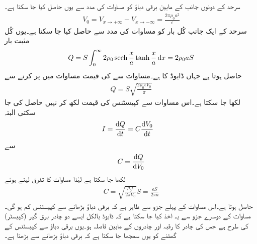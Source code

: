 سرحد کے دونوں جانب کے مابین برقی دباؤ  کو مساوات  کی مدد سے یوں حاصل کیا جا سکتا ہے۔
\begin{align}\label{مساوات_لاپلاس_ڈایوڈ_اندرونی_دباو}
V_0=V_{x \to +\infty}-V_{x \to -\infty}=\frac{2\pi\rho_0 a^2}{\epsilon}
\end{align}
سرحد کے ایک جانب کُل بار کو مساوات  کی مدد سے حاصل کیا جا سکتا ہے۔یوں کُل مثبت بار
\begin{align}\label{مساوات_لاپلاس_ڈایوڈ_کل_بار_الف}
Q=S \int_0^{\infty} 2 \rho_0 \sech \frac{x}{a}\tanh \frac{x}{a} \dif x=2\rho_0 a S
\end{align}
حاصل ہوتا ہے جہاں ڈایوڈ کا   ہے۔مساوات  سے  کی قیمت مساوات  میں پر کرنے سے
\begin{align}\label{مساوات_لاپلاس_ڈایوڈ_کل_بار_ب}
Q=S \sqrt{\frac{2\rho_0 \epsilon V_0}{\pi}}
\end{align} 
لکھا جا سکتا ہے۔اس مساوات سے کپیسٹنس کی قیمت  لکھ کر نہیں حاصل کی جا سکتی البتہ
\begin{align*}
I&=\frac{\dif Q}{\dif t} =C \frac{\dif V_0}{\dif t}
\end{align*}
سے
\begin{align*}
C=\frac{\dif Q}{\dif V_0}
\end{align*}
لکھا جا سکتا ہے  لہٰذا مساوات  کا تفرق لیتے ہوئے
\begin{align*}
C=\sqrt{\frac{\rho_0 \epsilon}{2\pi V_0}} S=\frac{\epsilon S}{2\pi a}
\end{align*}
حاصل ہوتا ہے۔اس مساوات  کے پہلے جزو سے ظاہر ہے کہ برقی دباؤ بڑھانے سے کپیسٹنس کم ہو گی۔مساوات کے دوسرے جزو سے یہ اخذ کیا جا سکتا ہے کہ ڈایوڈ بالکل ایسے  دو چادر برق گیر (کپیسٹر)  کی طرح ہے جس کی چادر کا رقبہ  اور چادروں کے مابین فاصلہ   ہو۔یوں برقی دباؤ سے کپیسٹنس کے گھٹنے کو یوں سمجھا جا سکتا ہے کہ برقی دباؤ بڑھانے سے   بڑھتا ہے۔ 

